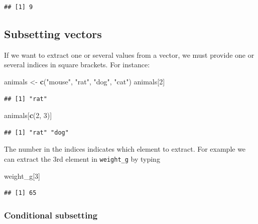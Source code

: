 \documentclass[
]{article}
\newenvironment{Shaded}{\begin{snugshade}}{\end{snugshade}}
\newcommand{\DecValTok}[1]{\textcolor[rgb]{0.00,0.00,0.81}{#1}}
\newcommand{\KeywordTok}[1]{\textcolor[rgb]{0.13,0.29,0.53}{\textbf{#1}}}
\newcommand{\NormalTok}[1]{#1}
\newcommand{\StringTok}[1]{\textcolor[rgb]{0.31,0.60,0.02}{#1}}
\begin{document}
\begin{verbatim}
## [1] 9
\end{verbatim}

\hypertarget{subsetting-vectors}{%
\subsection{Subsetting vectors}\label{subsetting-vectors}}

If we want to extract one or several values from a vector, we must
provide one or several indices in square brackets. For instance:

\begin{Shaded}
\begin{Highlighting}[]
\NormalTok{animals <-}\StringTok{ }\KeywordTok{c}\NormalTok{(}\StringTok{"mouse"}\NormalTok{, }\StringTok{"rat"}\NormalTok{, }\StringTok{"dog"}\NormalTok{, }\StringTok{"cat"}\NormalTok{)}
\NormalTok{animals[}\DecValTok{2}\NormalTok{]}
\end{Highlighting}
\end{Shaded}

\begin{verbatim}
## [1] "rat"
\end{verbatim}

\begin{Shaded}
\begin{Highlighting}[]
\NormalTok{animals[}\KeywordTok{c}\NormalTok{(}\DecValTok{2}\NormalTok{, }\DecValTok{3}\NormalTok{)]}
\end{Highlighting}
\end{Shaded}

\begin{verbatim}
## [1] "rat" "dog"
\end{verbatim}

The number in the indices indicates which element to extract. For
example we can extract the 3rd element in \texttt{weight\_g} by typing

\begin{Shaded}
\begin{Highlighting}[]
\NormalTok{weight_g[}\DecValTok{3}\NormalTok{]}
\end{Highlighting}
\end{Shaded}

\begin{verbatim}
## [1] 65
\end{verbatim}

\hypertarget{conditional-subsetting}{%
\subsubsection{Conditional subsetting}\label{conditional-subsetting}}
\end{document}
